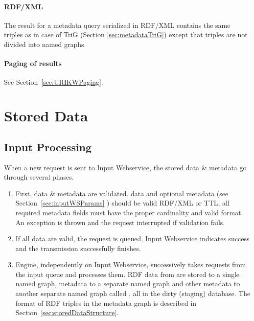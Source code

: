 {\subsubsection{RDF/XML}
The result for a metadata query serialized in RDF/XML contains the same triples as in case of TriG (Section \ref{sec:metadataTriG}) except that triples are not divided into named graphs.

\subsubsection{Paging of results}
See Section~\ref{sec:URIKWPaging}.



\chapter{Stored Data}
\section{Input Processing}
\label{sec:inputProcessing}
When a new request is sent to Input Webservice, the stored data \& metadata go through several phases.

\begin{enumerate}

  \item First, data \& metadata are validated.  data and optional  metadata (see Section~\ref{sec:inputWSParams} ) should be valid RDF/XML or TTL, all required metadata fields must have the proper cardinality and valid format. An exception is thrown and the request interrupted if validation fails.

  \item If all data are valid, the request is queued, Input Webservice indicates success and the transmission successfully finishes.

  \item Engine, independently on Input Webservice, successively takes requests from the input queue and processes them. RDF data from  are stored to a single named graph,  metadata to a separate named graph and other metadata to another separate named graph called , all in the dirty (staging) database. The format of RDF triples in the metadata graph is described in Section~\ref{sec:storedDataStructure}.


\end{enumerate}}
